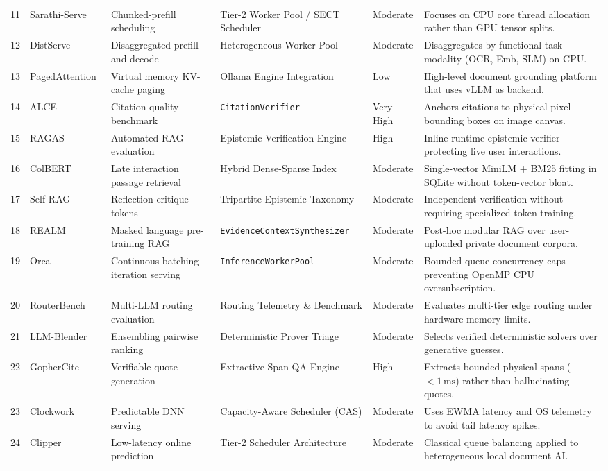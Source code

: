 \documentclass[11pt,a4paper]{article}
\begin{document}
\begin{table}[htbp]
{\begin{tabular}{@{}llllll@{}}
11 & Sarathi-Serve~\cite{Agrawal2024Sarathi} & Chunked-prefill scheduling & Tier-2 Worker Pool / SECT Scheduler & Moderate & Focuses on CPU core thread allocation rather than GPU tensor splits. \\
12 & DistServe~\cite{Zhong2024DistServe} & Disaggregated prefill and decode & Heterogeneous Worker Pool & Moderate & Disaggregates by functional task modality (OCR, Emb, SLM) on CPU. \\
13 & PagedAttention~\cite{Kwon2023vLLM} & Virtual memory KV-cache paging & Ollama Engine Integration & Low & High-level document grounding platform that uses vLLM as backend. \\
14 & ALCE~\cite{Gao2023ALCE} & Citation quality benchmark & \texttt{CitationVerifier} & Very High & Anchors citations to physical pixel bounding boxes on image canvas. \\
15 & RAGAS~\cite{Es2024Ragas} & Automated RAG evaluation & Epistemic Verification Engine & High & Inline runtime epistemic verifier protecting live user interactions. \\
16 & ColBERT~\cite{Khattab2020ColBERT} & Late interaction passage retrieval & Hybrid Dense-Sparse Index & Moderate & Single-vector MiniLM + BM25 fitting in SQLite without token-vector bloat. \\
17 & Self-RAG~\cite{Asai2024SelfRAG} & Reflection critique tokens & Tripartite Epistemic Taxonomy & Moderate & Independent verification without requiring specialized token training. \\
18 & REALM~\cite{Guu2020REALM} & Masked language pre-training RAG & \texttt{EvidenceContextSynthesizer} & Moderate & Post-hoc modular RAG over user-uploaded private document corpora. \\
19 & Orca~\cite{Yu2022Orca} & Continuous batching iteration serving & \texttt{InferenceWorkerPool} & Moderate & Bounded queue concurrency caps preventing OpenMP CPU oversubscription. \\
20 & RouterBench~\cite{Hu2024RouterBench} & Multi-LLM routing evaluation & Routing Telemetry \& Benchmark & Moderate & Evaluates multi-tier edge routing under hardware memory limits. \\
21 & LLM-Blender~\cite{Jiang2023LLMBlender} & Ensembling pairwise ranking & Deterministic Prover Triage & Moderate & Selects verified deterministic solvers over generative guesses. \\
22 & GopherCite~\cite{Menick2022GopherCite} & Verifiable quote generation & Extractive Span QA Engine & High & Extracts bounded physical spans ($< 1\,\text{ms}$) rather than hallucinating quotes. \\
23 & Clockwork~\cite{Gujarati2020Clockwork} & Predictable DNN serving & Capacity-Aware Scheduler (CAS) & Moderate & Uses EWMA latency and OS telemetry to avoid tail latency spikes. \\
24 & Clipper~\cite{Crankshaw2017Clipper} & Low-latency online prediction & Tier-2 Scheduler Architecture & Moderate & Classical queue balancing applied to heterogeneous local document AI. \\ \bottomrule
\end{tabular}%
}
\end{table}
\end{document}
